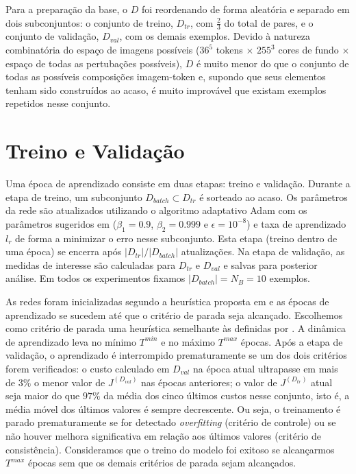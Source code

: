 Para a preparação da base, o $D$ foi reordenando de forma aleatória e separado em dois subconjuntos: o conjunto de treino, $D_{tr}$, com $\frac{2}{3}$ do total de pares, e o conjunto de validação, $D_{val}$, com os demais exemplos. Devido à natureza combinatória do espaço de imagens possíveis ($36^5$ tokens $\times$ $255^3$ cores de fundo $\times$ espaço de todas as pertubações possíveis), $D$ é muito menor do que o conjunto de todas as possíveis composições imagem-token e, supondo que seus elementos tenham sido construídos ao acaso, é muito improvável que existam exemplos repetidos nesse conjunto.

\section{Treino e Validação}\label{sec:treio_validacao}

Uma época de aprendizado consiste em duas etapas: treino e validação. Durante a etapa de treino, um subconjunto $D_{batch} \subset D_{tr}$ é sorteado ao acaso. Os parâmetros da rede são atualizados utilizando o algoritmo adaptativo Adam com os parâmetros sugeridos em \cite{adam_op} ($\beta_1 = 0.9$, $\beta_2 = 0.999$ e $\epsilon = 10^{-8}$) e taxa de aprendizado $l_r$ de forma a minimizar o erro nesse subconjunto. Esta etapa (treino dentro de uma época) se encerra após $|D_{tr}|/|D_{batch}|$ atualizações. Na etapa de validação, as medidas de interesse são calculadas para $D_{tr}$ e $D_{val}$ e salvas para posterior análise. Em todos os experimentos fixamos $|D_{batch}| = N_B = 10$ exemplos.

As redes foram inicializadas segundo a heurística proposta em \cite{HeZR015relu} e as épocas de aprendizado se sucedem até que o critério de parada seja alcançado. Escolhemos como critério de parada uma heurística semelhante às definidas por \cite{lutz_early_stop}. A dinâmica de aprendizado leva no mínimo $T^{min}$ e no máximo $T^{max}$ épocas. Após a etapa de validação, o aprendizado é interrompido prematuramente se um dos dois critérios forem verificados: o custo calculado em $D_{val}$ na época atual ultrapasse em mais de $3\%$ o menor valor de $J^{(D_{val})}$ nas épocas anteriores; o valor de $J^{(D_{tr})}$ atual seja maior do que $97\%$ da média dos cinco últimos custos nesse conjunto, isto é, a média móvel dos últimos valores é sempre decrescente. Ou seja, o treinamento é parado prematuramente se for detectado \textit{overfitting} (critério de controle) ou se não houver melhora significativa em relação aos últimos valores (critério de consistência). Consideramos que o treino do modelo foi exitoso se alcançarmos $T^{max}$ épocas sem que os demais critérios de parada sejam alcançados.

